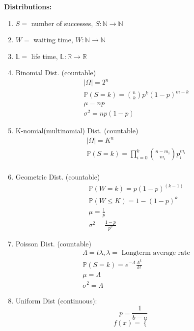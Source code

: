 \documentclass[12pt]{article}
\newcommand{\abs}[1]{\left| #1 \right|} %
\renewcommand{\=}[1]{\stackrel{#1}{=}} %
\theoremstyle{definition}
\theoremstyle{remark}
\begin{document}
  \newpage
  \textbf{Distributions:}
  \begin{enumerate}
  \item $S = $ number of successes, $S: \mathbb{N} \rightarrow \mathbb{N}$
  \item $W=$ waiting time, $W:\mathbb{N} \rightarrow \mathbb{N}$
  \item $\mathbb{L}=$ life time, $\mathbb{L}: \mathbb{R} \rightarrow \mathbb{R}$
  \item Binomial Dist. (countable)
    \begin{align*}
      &\abs{\Omega} = 2^n \\
      &\mathbb{P}(S = k) = \binom{n}{k} p^k(1-p)^{m-k} \\
      &\mu = np \\
      &\sigma^2 = np(1-p)
    \end{align*}
  \item K-nomial(multinomial) Dist. (countable)
    \begin{align*}
      &\abs{\Omega} = K^n \\
      &\mathbb{P}(S = k) = \prod_{i=0}^k \binom{n-m_i}{m_i} p_i^{m_i} \\
    \end{align*}
  \item Geometric Dist. (countable)
    \begin{align*}
      &\mathbb{P}(W=k)=p(1-p)^{(k-1)} \\
      &\mathbb{P}(W\leq K) = 1-(1-p)^k \\
      &\mu = \frac{1}{p} \\
      &\sigma^2= \frac{1-p}{p^2}
    \end{align*}
  \item Poisson Dist. (countable)
    \begin{align*}
      &\Lambda = t\lambda, \lambda = \textrm{ Longterm average rate} \\
      &\mathbb{P}(S=k) = e^{-\Lambda}\frac{\Lambda^k}{k!} \\
      &\mu = \Lambda \\
      &\sigma^2 = \Lambda
    \end{align*}
  \item Uniform Dist (continuous):\\
    \begin{equation}
      p = \frac{1}{b-a}
    \end{equation}
    \begin{displaymath}
      f(x) = \left\{
        \begin{array}{lr}

\end{array}
\end{displaymath}
\end{enumerate}
\end{document}
